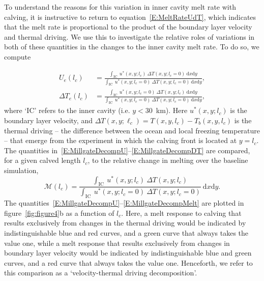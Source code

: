 \documentclass[draft]{agujournal2019}
\begin{document}
To understand the reasons for this variation in inner cavity melt rate with calving, it is instructive to return to equation~\eqref{E:MeltRateUdT}, which indicates that the melt rate is proportional to the product of the boundary layer velocity and thermal driving. We use this to investigate the relative roles of variations in both of these quantities in the changes to the inner cavity melt rate. To do so, we compute~\cite{Millgate2013JGROceans}

\begin{align}
  U_{e}(l_c) &=  \frac{\int_{\text{IC}}~u^*(x,y; l_c)~\Delta T(x,y;l_c = 0)~\mathrm{d}x\mathrm{d}y}{\int_{\text{IC}}~ u^*(x,y; l_c = 0)~\Delta T(x,y;l_c = 0)~\mathrm{d}x\mathrm{d}y}, \label{E:MillgateDecompU}\\ \Delta T_{e}(l_c) &=  \frac{\int_{\text{IC}}~u^*(x,y; l_c=0)~\Delta T(x,y;l_c)~\mathrm{d}x\mathrm{d}y}{\int_{\text{IC}}~ u^*(x,y; l_c = 0)~\Delta T(x,y;l_c = 0)~\mathrm{d}x\mathrm{d}y}, \label{E:MillgateDecompDT}
\end{align}
where `IC' refers to the inner cavity (i.e. $y < 30$~km). Here $u^*(x,y;l_c)$ is the boundary layer velocity, and $\Delta T(x,y;\ell_c) = T(x,y,l_c) - T_b(x,y,l_c)$ is the thermal driving -- the difference between the ocean and local freezing temperature -- that emerge from the experiment in which the calving front is located at $y = l_c$. The quantities in~\eqref{E:MillgateDecompU}--\eqref{E:MillgateDecompDT} are compared, for a given calved length $l_c$, to the relative change in melting over the baseline simulation,
 \begin{equation}\label{E:MillgateDecompMelt}
   \mathcal{M}(l_c) =  \frac{\int_{\text{IC}}~u^*(x,y; l_c)~\Delta T(x,y;l_c)}{\int_{\text{IC}}~ u^*(x,y; l_c = 0)~\Delta T(x,y;l_c = 0)}~\mathrm{d}x\mathrm{d}y.
 \end{equation}
The quantities~\eqref{E:MillgateDecompU}--\eqref{E:MillgateDecompMelt} are plotted in figure~\ref{fig:figure4}b as a function of $l_c$.  Here, a melt response to calving that results exclusively from changes in the thermal driving would be indicated by indistinguishable blue and red curves, and a green curve that always takes the value one, while a melt response that results exclusively from changes in boundary layer velocity would be indicated by indistinguishable blue and green curves, and a red curve that always takes the value one. Henceforth, we refer to this comparison as a `velocity-thermal driving decomposition'. %
\end{document}
